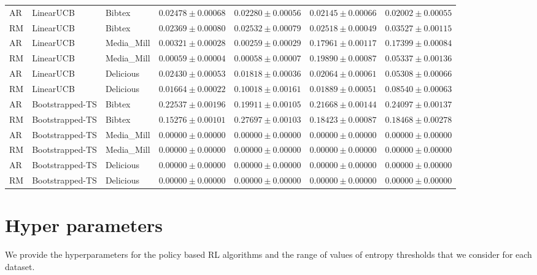 \begin{table*}[!htbp]
{\begin{tabular}{lllcccc}
        AR & LinearUCB & Bibtex & $\mathbf{0.02478 \pm 0.00068}$ & $0.02280 \pm 0.00056$ & $0.02145 \pm 0.00066$ & $0.02002 \pm 0.00055$ \\[5pt]
        RM & LinearUCB & Bibtex & $0.02369 \pm 0.00080$ & $0.02532 \pm 0.00079$ & $0.02518 \pm 0.00049$ & $\mathbf{0.03527 \pm 0.00115}$ \\[5pt]
        AR & LinearUCB & Media\_Mill & $0.00321 \pm 0.00028$ & $0.00259 \pm 0.00029$ & $\mathbf{0.17961 \pm 0.00117}$ & $0.17399 \pm 0.00084$ \\[5pt]
        RM & LinearUCB & Media\_Mill & $0.00059 \pm 0.00004$ & $0.00058 \pm 0.00007$ & $\mathbf{0.19890 \pm 0.00087}$ & $0.05337 \pm 0.00136$ \\[5pt]
        AR & LinearUCB & Delicious & $\mathbf{0.02430 \pm 0.00053}$ & $0.01818 \pm 0.00036$ & $0.02064 \pm 0.00061$ & $0.05308 \pm 0.00066$ \\[5pt]
        RM & LinearUCB & Delicious & $0.01664 \pm 0.00022$ & $\mathbf{0.10018 \pm 0.00161}$ & $0.01889 \pm 0.00051$ & $0.08540 \pm 0.00063$ \\[5pt]
        AR & Bootstrapped-TS & Bibtex & $0.22537 \pm 0.00196$ & $0.19911 \pm 0.00105$ & $0.21668 \pm 0.00144$ & $\mathbf{0.24097 \pm 0.00137}$ \\[5pt]
        RM & Bootstrapped-TS & Bibtex & $0.15276 \pm 0.00101$ & $\mathbf{0.27697 \pm 0.00103}$ & $0.18423 \pm 0.00087$ & $0.18468 \pm 0.00278$ \\[5pt]
        AR & Bootstrapped-TS & Media\_Mill & $0.00000 \pm 0.00000$ & $0.00000 \pm 0.00000$ & $0.00000 \pm 0.00000$ & $0.00000 \pm 0.00000$ \\[5pt]
        RM & Bootstrapped-TS & Media\_Mill & $0.00000 \pm 0.00000$ & $0.00000 \pm 0.00000$ & $0.00000 \pm 0.00000$ & $0.00000 \pm 0.00000$ \\[5pt]
        AR & Bootstrapped-TS & Delicious & $0.00000 \pm 0.00000$ & $0.00000 \pm 0.00000$ & $0.00000 \pm 0.00000$ & $0.00000 \pm 0.00000$ \\[5pt]
        RM & Bootstrapped-TS & Delicious & $0.00000 \pm 0.00000$ & $0.00000 \pm 0.00000$ & $0.00000 \pm 0.00000$ & $0.00000 \pm 0.00000$ \\
        \bottomrule
    \end{tabular}%
    }
\end{table*}

\section{Hyper parameters}
We provide the hyperparameters for the policy based RL algorithms and the range of values of entropy thresholds that we consider for each dataset. 

